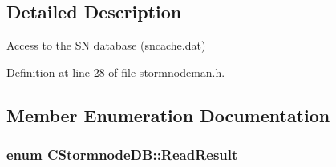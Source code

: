 \subsection{Detailed Description}
Access to the S\+N database (sncache.\+dat) 

Definition at line 28 of file stormnodeman.\+h.



\subsection{Member Enumeration Documentation}
\hypertarget{class_c_stormnode_d_b_a81c48785c6e811c3751c2aee6ad0b5ce}{}
\subsubsection[{Read\+Result}]{\setlength{\rightskip}{0pt plus 5cm}enum {\bf C\+Stormnode\+D\+B\+::\+Read\+Result}}\label{class_c_stormnode_d_b_a81c48785c6e811c3751c2aee6ad0b5ce}
